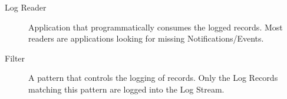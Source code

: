 \begin{flushleft}
\begin{description}
\item[Log Reader] Application that programmatically consumes the logged records. Most readers are applications looking for missing 
Notifications/Events.
\end{description}


\begin{description}
\item[Filter] A pattern that controls the logging of records. Only the Log Records matching this pattern are logged into the Log Stream.
\end{description}






\end{flushleft}